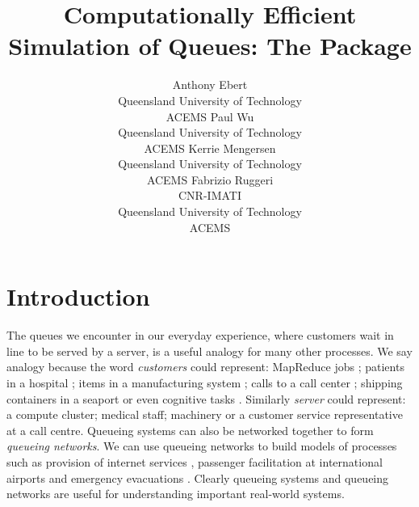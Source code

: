 \documentclass[article]{jss}
\author{Anthony  Ebert\\Queensland University of Technology\\ACEMS \And 
        Paul Wu\\Queensland University of Technology\\ACEMS \AND
        Kerrie Mengersen\\Queensland University of Technology\\ACEMS \And
        Fabrizio Ruggeri\\CNR-IMATI\\Queensland University of Technology\\ACEMS}
\title{Computationally Efficient Simulation of Queues: The \proglang{R} Package \pkg{queuecomputer}}
\begin{document}
\section{Introduction}



The queues we encounter in our everyday experience, where customers wait in line to be served by a server, is a useful analogy for many other processes. We say analogy because the word \textit{customers} could represent: MapReduce jobs \citep{lin_joint_2013}; patients in a hospital \citep{takagi_queueing_2016}; items in a manufacturing system \citep{dallery_manufacturing_1992}; calls to a call center \citep{gans_telephone_2003}; shipping containers in a seaport \citep{kozan_comparison_1997} or even cognitive tasks \citep{cao_queueing_2013}. Similarly \textit{server} could represent: a compute cluster; medical staff; machinery or a customer service representative at a call centre. Queueing systems can also be networked together to form \textit{queueing networks}. We can use queueing networks to build models of processes such as provision of internet services \citep{sutton_bayesian_2011}, passenger facilitation at international airports \citep{wu_review_2013} and emergency evacuations \citep{van_woensel_modeling_2007}. Clearly queueing systems and queueing networks are useful for understanding important real-world systems. 
\end{document}
